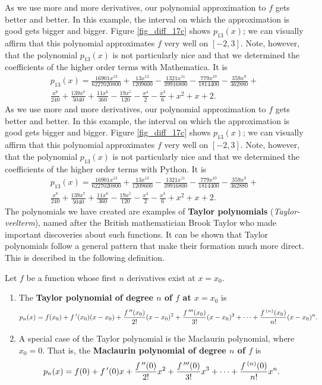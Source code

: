 \ifmathematica
As we use more and more derivatives, our polynomial approximation to $f$ gets better and better. In this example, the interval on which the approximation is good gets bigger and bigger. Figure \ref{fig_diff_17c} shows $p_{13}(x)$; we can visually affirm that this polynomial approximates $f$ very well on $[-2,3]$. Note, however, that the polynomial $p_{13}(x)$ is not particularly nice and that we determined the coefficients of the higher order terms with Mathematica. It is \begin{multline*}
p_{13}(x)= \frac{16901x^{13}}{6227020800}+\frac{13x^{12}}{1209600}-\frac{1321x^{11}}{39916800}-\frac{779x^{10}}{1814400}-\frac{359x^9}{362880}+\\
\frac{x^8}{240}+\frac{139x^7}{5040}+\frac{11 x^6}{360}-\frac{19x^5}{120}-\frac{x^4}{2}-\frac{x^3}{6}+x^2+x+2.
\end{multline*}
\fi
\ifpython
As we use more and more derivatives, our polynomial approximation to $f$ gets better and better. In this example, the interval on which the approximation is good gets bigger and bigger. Figure \ref{fig_diff_17c} shows $p_{13}(x)$; we can visually affirm that this polynomial approximates $f$ very well on $[-2,3]$. Note, however, that the polynomial $p_{13}(x)$ is not particularly nice and that we determined the coefficients of the higher order terms with Python. It is \begin{multline*}
p_{13}(x)= \frac{16901x^{13}}{6227020800}+\frac{13x^{12}}{1209600}-\frac{1321x^{11}}{39916800}-\frac{779x^{10}}{1814400}-\frac{359x^9}{362880}+\\
\frac{x^8}{240}+\frac{139x^7}{5040}+\frac{11 x^6}{360}-\frac{19x^5}{120}-\frac{x^4}{2}-\frac{x^3}{6}+x^2+x+2.
\end{multline*}
\fi
The polynomials we have created are examples of \textbf{Taylor polynomials} (\textit{Taylor-veelterm}), named after the British mathematician Brook Taylor who made important discoveries about such functions. It can be shown that Taylor polynomials follow a general pattern that make their formation much more direct. This is described in the following definition.

\begin{definition}\label{def:taypoly}
Let $f$ be a function whose first $n$ derivatives exist at $x=x_0$.
 
\begin{enumerate}
\item		The \textbf{Taylor polynomial of degree $n$ of $f$ at $x=x_0$} is 
				{$$p_n(x) = f(x_0) + f\,'(x_0)(x-x_0) + \frac{f\,''(x_0)}{2!}(x-x_0)^2+\frac{f\,'''(x_0)}{3!}(x-x_0)^3+\cdots+\frac{f\,^{(n)}(x_0)}{n!}(x-x_0)^n.$$}
\item		A special case of the Taylor polynomial is the Maclaurin polynomial, where $x_0=0$. That is, the \textbf{Maclaurin polynomial of degree $n$ of $f$} is 
{$$p_n(x) = f(0) + f\,'(0)x + \frac{f\,''(0)}{2!}x^2+\frac{f\,'''(0)}{3!}x^3+\cdots+\frac{f\,^{(n)}(0)}{n!}x^n.$$}
\end{enumerate}
\end{definition}


